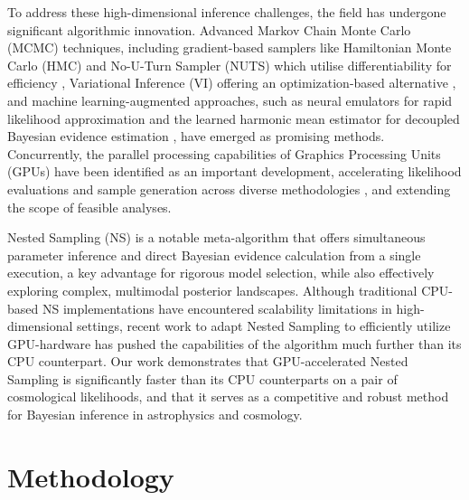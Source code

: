 \documentclass[twocolumn]{openjournal}
\begin{document}
To address these high-dimensional inference challenges, the field has undergone significant algorithmic innovation. Advanced Markov Chain Monte Carlo (MCMC) techniques, including gradient-based samplers like Hamiltonian Monte Carlo (HMC) and No-U-Turn Sampler (NUTS) which utilise differentiability for efficiency \citep{jaxcosmo, Dupourqu__2024}, Variational Inference (VI) offering an optimization-based alternative \citep{VIacceleration}, and machine learning-augmented approaches, such as neural emulators for rapid likelihood approximation \citep{Piras_2023} and the learned harmonic mean estimator for decoupled Bayesian evidence estimation \citep{Piras_2024,polanska2025learnedharmonicmeanestimation}, have emerged as promising methods. Concurrently, the parallel processing capabilities of Graphics Processing Units (GPUs) have been identified as an important development, accelerating likelihood evaluations and sample generation across diverse methodologies \citep{Gu_2022, GPUacc,metha}, and extending the scope of feasible analyses.

Nested Sampling (NS) \citep{Skilling06} is a notable meta-algorithm that offers simultaneous parameter inference and direct Bayesian evidence calculation from a single execution, a key advantage for rigorous model selection, while also effectively exploring complex, multimodal posterior landscapes. Although traditional CPU-based NS implementations have encountered scalability limitations in high-dimensional settings, recent work to adapt Nested Sampling to efficiently utilize GPU-hardware \citep{NSSyallup} has pushed the capabilities of the algorithm much further than its CPU counterpart. Our work demonstrates that GPU-accelerated Nested Sampling is significantly faster than its CPU counterparts on a pair of cosmological likelihoods, and that it serves as a competitive and robust method for Bayesian inference in astrophysics and cosmology.

\section{Methodology}
\label{sec:methodology}
\end{document}
